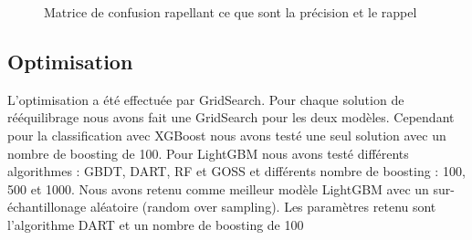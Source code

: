 \documentclass[12pt, a4paper]{article}
\begin{document}
\begin{figure}[h]
    \begin{center}
    \end{center}
    \caption{Matrice de confusion rapellant ce que sont la précision et le rappel}
    \label{fig:ConfMatrix}
\end{figure}

\subsection{Optimisation}

L'optimisation a été effectuée par GridSearch. Pour chaque solution de rééquilibrage nous avons fait une GridSearch pour les deux modèles. Cependant pour la classification avec XGBoost nous avons testé une seul solution avec un nombre de boosting de 100.
Pour LightGBM nous avons testé différents algorithmes : GBDT, DART, RF et GOSS et différents nombre de boosting : 100, 500 et 1000.
Nous avons retenu comme meilleur modèle LightGBM avec un sur-échantillonage aléatoire (random over sampling). Les paramètres retenu sont l'algorithme DART et un nombre de boosting de 100
\end{document}
